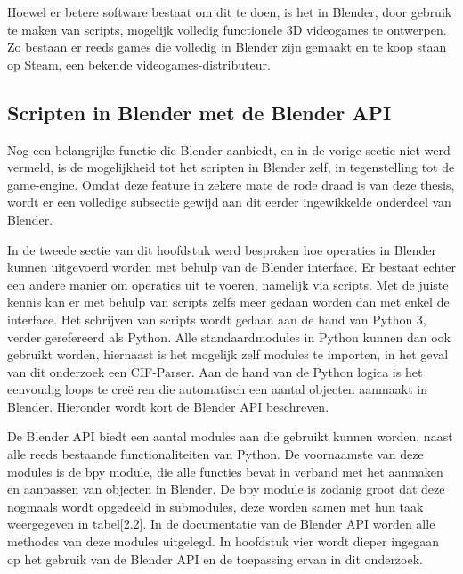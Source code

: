 \par
Hoewel er betere software bestaat om dit te doen, is het in Blender, door gebruik te maken van scripts, mogelijk volledig functionele 3D videogames te ontwerpen. Zo bestaan er reeds games die volledig in Blender zijn gemaakt en te koop staan op Steam, een bekende videogames-distributeur.

\subsection{Scripten in Blender met de Blender API}
Nog een belangrijke functie die Blender aanbiedt, en in de vorige sectie niet werd vermeld, is de mogelijkheid tot het scripten in Blender zelf, in tegenstelling tot de game-engine. Omdat deze feature in zekere mate de rode draad is van deze thesis, wordt er een volledige subsectie gewijd aan dit eerder ingewikkelde onderdeel van Blender.

\par
In de tweede sectie van dit hoofdstuk werd besproken hoe operaties in Blender kunnen uitgevoerd worden met behulp van de Blender interface. Er bestaat echter een andere manier om operaties uit te voeren, namelijk via scripts. Met de juiste kennis kan er met behulp van scripts zelfs meer gedaan worden dan met enkel de interface. 
Het schrijven van scripts wordt gedaan aan de hand van Python 3, verder gerefereerd als Python. Alle standaardmodules in Python kunnen dan ook gebruikt worden, hiernaast is het mogelijk zelf modules te importen, in het geval van dit onderzoek een CIF-Parser. Aan de hand van de Python logica is het eenvoudig loops te cre\"{e} ren die automatisch een aantal objecten aanmaakt in Blender. Hieronder wordt kort de Blender API beschreven.

\par
De Blender API biedt een aantal modules aan die gebruikt kunnen worden, naast alle reeds bestaande functionaliteiten van Python. De voornaamste van deze modules is de bpy module, die alle functies bevat in verband met het aanmaken en aanpassen van objecten in Blender. De bpy module is zodanig groot dat deze nogmaals wordt opgedeeld in submodules, deze worden samen met hun taak weergegeven in tabel[2.2]. In de documentatie van de Blender API worden alle methodes van deze modules uitgelegd. In hoofdstuk vier wordt dieper ingegaan op het gebruik van de Blender API en de toepassing ervan in dit onderzoek.

